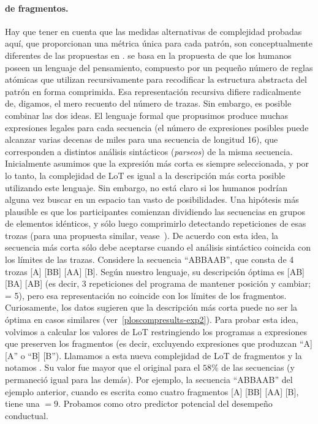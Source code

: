 \paragraph{\mdlbin de fragmentos.} Hay que tener en cuenta que las medidas alternativas de complejidad probadas aquí, que proporcionan una métrica única para cada patrón, son conceptualmente diferentes de las propuestas en \mdlbin. \mdlbin se basa en la propuesta de que los humanos poseen un lenguaje del pensamiento, compuesto por un pequeño número de reglas atómicas que utilizan recursivamente para recodificar la estructura abstracta del patrón en forma comprimida. Esa representación recursiva difiere radicalmente de, digamos, el mero recuento del número de trazas. Sin embargo, es posible combinar las dos ideas. El lenguaje formal que propusimos produce muchas expresiones legales para cada secuencia (el número de expresiones posibles puede alcanzar varias decenas de miles para una secuencia de longitud 16), que corresponden a distintos análisis sintácticos (\textit{parseos}) de la misma secuencia. Inicialmente asumimos que la expresión más corta es siempre seleccionada, y por lo tanto, la complejidad de LoT es igual a la descripción más corta posible utilizando este lenguaje. Sin embargo, no está claro si los humanos podrían alguna vez buscar en un espacio tan vasto de posibilidades. Una hipótesis más plausible es que los participantes comienzan dividiendo las secuencias en grupos de elementos idénticos, y sólo luego comprimirlo detectando repeticiones de esas trozas (para una propuesta similar, vease~\cite{f33,f49}). De acuerdo con esta idea, la secuencia más corta sólo debe aceptarse cuando el análisis sintáctico coincida con los límites de las trazas. Considere la secuencia ``ABBAAB'', que consta de 4 trozas [A] [BB] [AA] [B]. Según nuestro lenguaje, su descripción óptima es [AB] [BA] [AB] (es decir, 3 repeticiones del programa de mantener posición y cambiar; \mdlbin = 5), pero esa representación no coincide con los límites de los fragmentos. Curiosamente, los datos sugieren que la descripción más corta puede no ser la óptima en casos similares (ver~\ref{ploscompresults-exp2}). Para probar esta idea, volvimos a calcular los valores de LoT restringiendo los programas a expresiones que preserven los fragmentos (es decir, excluyendo expresiones que produzcan ``A] [A'' o ``B] [B''). Llamamos a esta nueva complejidad de LoT \mdlbin de fragmentos y la notamos \mdlbinfrag. Su valor fue mayor que el original para el $58\%$ de las secuencias (y permaneció igual para las demás). Por ejemplo, la secuencia ``ABBAAB'' del ejemplo anterior, cuando es escrita como cuatro fragmentos [A] [BB] [AA] [B], tiene una \mdlbinfrag $= 9$. Probamos \mdlbinfrag como otro predictor potencial del desempeño conductual.

